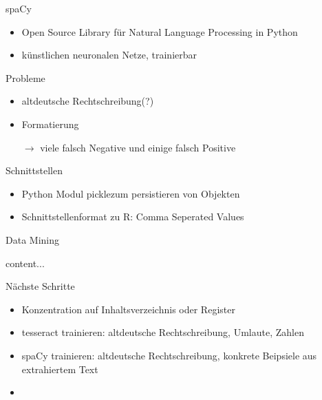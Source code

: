 \documentclass{beamer}
\begin{document}
\begin{frame}{spaCy}
	\begin{itemize}
		\item Open Source Library für Natural Language Processing in Python
		\item künstlichen neuronalen Netze, trainierbar
	\end{itemize}
\begin{block}{Probleme}
	\begin{itemize}
	\item altdeutsche Rechtschreibung(?)
	\item Formatierung
	\item[$\rightarrow $ ] viele falsch Negative und einige falsch Positive
	\end{itemize}
\end{block}
\end{frame}
\begin{frame}{Schnittstellen}
	\begin{itemize}
		\item Python Modul \glqq pickle\grqq  zum persistieren von Objekten
		\item Schnittstellenformat zu R: Comma Seperated Values
	\end{itemize}
\end{frame}
\begin{frame}{Data Mining}
	\begin{itemize}
		content...
	\end{itemize}
\end{frame}
\begin{frame}{Nächste Schritte}
	\begin{itemize}
		\item Konzentration auf Inhaltsverzeichnis oder Register
		\item tesseract trainieren: altdeutsche Rechtschreibung, Umlaute, Zahlen
		\item spaCy trainieren: altdeutsche Rechtschreibung, konkrete Beipsiele aus extrahiertem Text
		\item 

	\end{itemize}
\end{frame}
\end{document}
